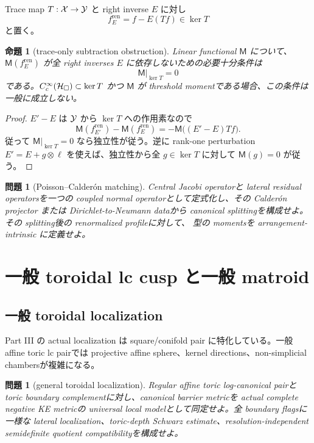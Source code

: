 \documentclass[11pt,a4paper]{ltjsarticle}
\theoremstyle{plain}
\newtheorem{problem}[conjecture]{問題}
\newtheorem{proposition}[conjecture]{命題}
\theoremstyle{definition}
\theoremstyle{remark}
\begin{document}
Trace map $T:\mathcal X\to\mathcal Y$ と right inverse $E$ に対し
\[
 f_E^{\mathrm{ren}}=f-E(Tf)\in\ker T
\]
と置く。

\begin{proposition}[trace-only subtraction obstruction]\label{prop:trace-obstruction-v22}
Linear functional $\mathsf M$ について、$\mathsf M(f_E^{\mathrm{ren}})$ が全 right inverses $E$ に依存しないための必要十分条件は
\[
 \mathsf M|_{\ker T}=0
\]
である。$C_c^\infty(\mathcal H_\square)\subset\ker T$ かつ $\mathsf M$ が threshold momentである場合、この条件は一般に成立しない。
\end{proposition}

\begin{proof}
$E'-E$ は $\mathcal Y$ から $\ker T$ への作用素なので
\[
 \mathsf M(f_{E'}^{\mathrm{ren}})-\mathsf M(f_E^{\mathrm{ren}})
 =-\mathsf M\bigl((E'-E)Tf\bigr).
\]
従って $\mathsf M|_{\ker T}=0$ なら独立性が従う。逆に rank-one perturbation $E'=E+g\otimes\ell$ を使えば、独立性から全 $g\in\ker T$ に対して $\mathsf M(g)=0$ が従う。
\end{proof}

\begin{problem}[Poisson--Calder\'on matching]\label{prob:calderon-v22}
Central Jacobi operatorと lateral residual operatorsを一つの coupled normal operatorとして定式化し、その Calder\'on projector または Dirichlet-to-Neumann dataから canonical splittingを構成せよ。その splitting後の renormalized profileに対して、 型の momentsを arrangement-intrinsic に定義せよ。
\end{problem}

\section{一般 toroidal lc cusp と一般 matroid}

\subsection{一般 toroidal localization}

Part III の actual localization は square/conifold pair に特化している。一般 affine toric lc pairでは projective affine sphere、kernel directions、non-simplicial chambersが複雑になる。

\begin{problem}[general toroidal localization]\label{prob:general-toroidal-v22}
Regular affine toric log-canonical pairと toric boundary complementに対し、canonical barrier metricを actual complete negative KE metricの universal local modelとして同定せよ。全 boundary flagsに一様な lateral localization、toric-depth Schwarz estimate、resolution-independent semidefinite quotient compatibilityを構成せよ。
\end{problem}
\end{document}
